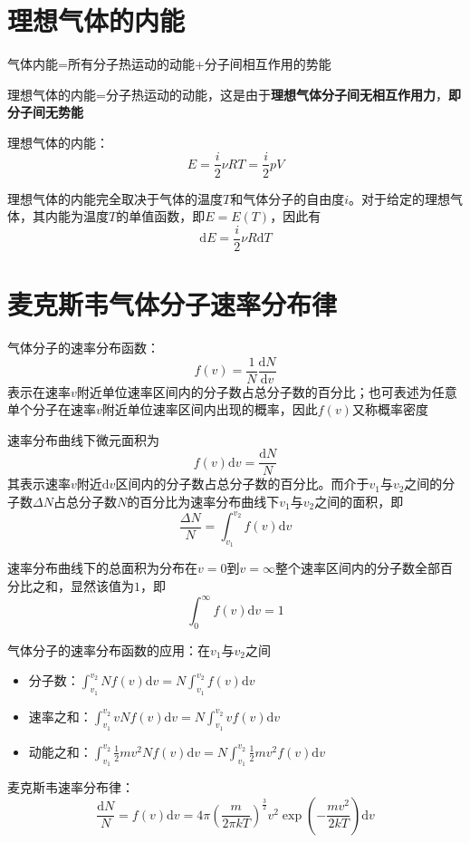 \documentclass[12pt, a4paper, twoside]{ctexbook}
\begin{document}
\section{理想气体的内能}
{\sonti 气体内能}=所有分子热运动的{\sonti 动能}+分子间相互作用的{\sonti 势能}

{\sonti 理想气体的内能}=分子热运动的{\sonti 动能}，这是由于\textbf{理想气体分子间无相互作用力}，\textbf{即分子间无势能}

{\sonti 理想气体的内能}：
$$
E=\frac{i}{2}\nu RT=\frac{i}{2}pV
$$

理想气体的内能完全取决于气体的温度$T$和气体分子的自由度$i$。对于给定的理想气体，其内能为温度$T$的单值函数，即$E=E\left(T\right)$，因此有
$$
\mathrm{d}E=\frac{i}{2}\nu R\mathrm{d}T
$$
\section{麦克斯韦气体分子速率分布律}
{\sonti 气体分子的速率分布函数}：
$$
f\left(v\right)=\frac{1}{N}\frac{\mathrm{d}N}{\mathrm{d}v}
$$
表示在速率$v$附近单位速率区间内的分子数占总分子数的百分比；也可表述为任意单个分子在速率$v$附近单位速率区间内出现的概率，因此$f\left(v\right)$又称概率密度

速率分布曲线下微元面积为
$$
f\left(v\right)\mathrm{d}v=\frac{\mathrm{d}N}{N}
$$
其表示速率$v$附近$\mathrm{d}v$区间内的分子数占总分子数的百分比。而介于$v_1$与$v_2$之间的分子数$\Delta N$占总分子数$N$的百分比为速率分布曲线下$v_1$与$v_2$之间的面积，即
$$
\frac{\Delta N}{N}=\int_{v_1}^{v_2}f\left(v\right)\mathrm{d}v
$$

速率分布曲线下的总面积为分布在$v=0$到$v=\infty$整个速率区间内的分子数全部百分比之和，显然该值为$1$，即
$$
\int_{0}^{\infty}f\left(v\right)\mathrm{d}v=1
$$

{\sonti 气体分子的速率分布函数的应用}：在$v_1$与$v_2$之间
\begin{itemize}
    \item 分子数：$\int_{v_1}^{v_2}Nf\left(v\right)\mathrm{d}v=N\int_{v_1}^{v_2}f\left(v\right)\mathrm{d}v$
    \item 速率之和：$\int_{v_1}^{v_2}vNf\left(v\right)\mathrm{d}v=N\int_{v_1}^{v_2}vf\left(v\right)\mathrm{d}v$
    \item 动能之和：$\int_{v_1}^{v_2}\frac{1}{2}mv^2Nf\left(v\right)\mathrm{d}v=N\int_{v_1}^{v_2}\frac{1}{2}mv^2f\left(v\right)\mathrm{d}v$
\end{itemize}

{\sonti 麦克斯韦速率分布律}：
$$
\frac{\mathrm{d}N}{N}=f\left(v\right)\mathrm{d}v=4\pi\left(\frac{m}{2\pi kT}\right)^{\frac{3}{2}}v^2\exp\left(-\frac{mv^2}{2kT}\right)\mathrm{d}v
$$
\end{document}
